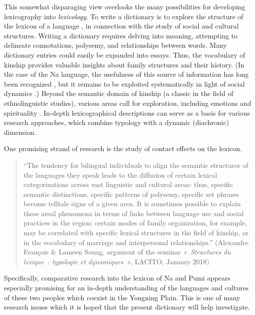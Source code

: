 This somewhat disparaging view overlooks the many possibilities for developing lexicography into \emph{lexicology}. To write a dictionary is to explore the structure of the lexicon of a language \parencite{francois2008semantic}, in connection with the study of social and cultural structures. Writing a dictionary requires delving into meaning, attempting to delineate connotations, polysemy, and relationships between words. Many dictionary entries could easily be expanded into essays. Thus, the vocabulary of kinship provides valuable insights about family structures and their history. (In the case of the Na language, the usefulness of this source of information has long been recognized \parencite{fu1983}, but it remains to be exploited systematically in light of social dynamics \parencite{milan2021entraide}.) Beyond the semantic domain of kinship (a classic in the field of ethnolinguistic studies), various areas call for exploration, including emotions \parencite{tersis_langage_2017} and spirituality \parencite{francois_shadows_2013}. In-depth lexicographical descriptions can serve as a basis for various research approaches, which combine typology with a dynamic (diachronic) dimension.

One promising strand of research is the study of contact effects on the lexicon.

\begin{quotation}
    “The tendency for bilingual individuals to align the semantic structures of the languages they speak leads to the diffusion of certain lexical categorizations across vast linguistic and cultural areas: thus, specific semantic distinctions, specific patterns of polysemy, specific set phrases become telltale signs of a given area. It is sometimes possible to explain these areal phenomena in terms of links between language use and social practices in the region: certain modes of family organization, for example, may be correlated with specific lexical structures in the field of kinship, or in the vocabulary of marriage and interpersonal relationships.” (Alexandre François \& Lameen Souag, argument of the seminar \emph{« Structures du lexique : typologie et dynamiques »}, LACITO, January 2018)
\end{quotation}

Specifically, comparative research into the lexicon of Na and Pumi \parencite{daudey2014} appears especially promising for an in-depth understanding of the languages and cultures of these two peoples which coexist in the Yongning Plain. This is one of many research issues which it is hoped that the present dictionary will help investigate.

